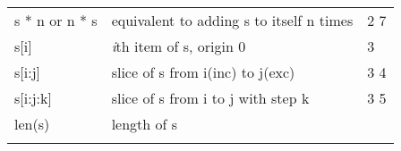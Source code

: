 \documentclass[11pt]{article}
\begin{document}
\begin{longtable}[]{@{}lll@{}}
\begin{minipage}[t]{0.14\columnwidth}
s * n or n * s\strut
\end{minipage} & \begin{minipage}[t]{0.14\columnwidth}\raggedright\strut
equivalent to adding s to itself n times\strut
\end{minipage} & \begin{minipage}[t]{0.14\columnwidth}\raggedright\strut
2 7\strut
\end{minipage}\tabularnewline
\begin{minipage}[t]{0.14\columnwidth}\raggedright\strut
s{[}i{]}\strut
\end{minipage} & \begin{minipage}[t]{0.14\columnwidth}\raggedright\strut
\emph{i}th item of s, origin 0\strut
\end{minipage} & \begin{minipage}[t]{0.14\columnwidth}\raggedright\strut
3\strut
\end{minipage}\tabularnewline
\begin{minipage}[t]{0.14\columnwidth}\raggedright\strut
s{[}i:j{]}\strut
\end{minipage} & \begin{minipage}[t]{0.14\columnwidth}\raggedright\strut
slice of s from i(inc) to j(exc)\strut
\end{minipage} & \begin{minipage}[t]{0.14\columnwidth}\raggedright\strut
3 4\strut
\end{minipage}\tabularnewline
\begin{minipage}[t]{0.14\columnwidth}\raggedright\strut
s{[}i:j:k{]}\strut
\end{minipage} & \begin{minipage}[t]{0.14\columnwidth}\raggedright\strut
slice of s from i to j with step k\strut
\end{minipage} & \begin{minipage}[t]{0.14\columnwidth}\raggedright\strut
3 5\strut
\end{minipage}\tabularnewline
\begin{minipage}[t]{0.14\columnwidth}\raggedright\strut
len(s)\strut
\end{minipage} & \begin{minipage}[t]{0.14\columnwidth}\raggedright\strut
length of s\strut
\end{minipage} & \begin{minipage}[t]{0.14\columnwidth}\raggedright\strut
\strut
\end{minipage}\tabularnewline
\begin{minipage}[t]{0.14\columnwidth}\raggedright\strut

\end{minipage}
\end{longtable}
\end{document}
